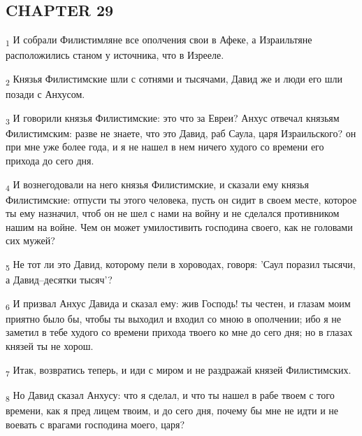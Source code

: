 \subsection{CHAPTER 29}
\begin{tcolorbox}
\textsubscript{1} И собрали Филистимляне все ополчения свои в Афеке, а Израильтяне расположились станом у источника, что в Изрееле.
\end{tcolorbox}
\begin{tcolorbox}
\textsubscript{2} Князья Филистимские шли с сотнями и тысячами, Давид же и люди его шли позади с Анхусом.
\end{tcolorbox}
\begin{tcolorbox}
\textsubscript{3} И говорили князья Филистимские: это что за Евреи? Анхус отвечал князьям Филистимским: разве не знаете, что это Давид, раб Саула, царя Израильского? он при мне уже более года, и я не нашел в нем ничего худого со времени его прихода до сего дня.
\end{tcolorbox}
\begin{tcolorbox}
\textsubscript{4} И вознегодовали на него князья Филистимские, и сказали ему князья Филистимские: отпусти ты этого человека, пусть он сидит в своем месте, которое ты ему назначил, чтоб он не шел с нами на войну и не сделался противником нашим на войне. Чем он может умилостивить господина своего, как не головами сих мужей?
\end{tcolorbox}
\begin{tcolorbox}
\textsubscript{5} Не тот ли это Давид, которому пели в хороводах, говоря: 'Саул поразил тысячи, а Давид--десятки тысяч'?
\end{tcolorbox}
\begin{tcolorbox}
\textsubscript{6} И призвал Анхус Давида и сказал ему: жив Господь! ты честен, и глазам моим приятно было бы, чтобы ты выходил и входил со мною в ополчении; ибо я не заметил в тебе худого со времени прихода твоего ко мне до сего дня; но в глазах князей ты не хорош.
\end{tcolorbox}
\begin{tcolorbox}
\textsubscript{7} Итак, возвратись теперь, и иди с миром и не раздражай князей Филистимских.
\end{tcolorbox}
\begin{tcolorbox}
\textsubscript{8} Но Давид сказал Анхусу: что я сделал, и что ты нашел в рабе твоем с того времени, как я пред лицем твоим, и до сего дня, почему бы мне не идти и не воевать с врагами господина моего, царя?
\end{tcolorbox}
